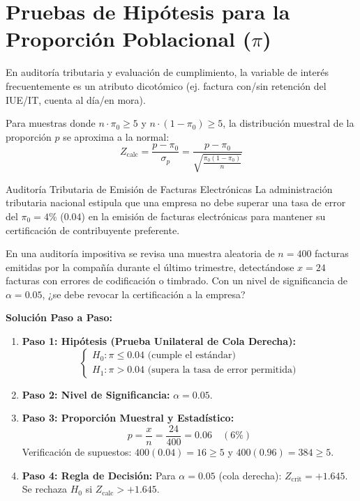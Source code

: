 \section{Pruebas de Hipótesis para la Proporción Poblacional ($\pi$)}
En auditoría tributaria y evaluación de cumplimiento, la variable de interés frecuentemente es un atributo dicotómico (ej. factura con/sin retención del IUE/IT, cuenta al día/en mora). 

Para muestras donde $n \cdot \pi_0 \ge 5$ y $n \cdot (1 - \pi_0) \ge 5$, la distribución muestral de la proporción $p$ se aproxima a la normal:
\begin{equation}
    Z_{\text{calc}} = \frac{p - \pi_0}{\sigma_p} = \frac{p - \pi_0}{\sqrt{\frac{\pi_0 (1 - \pi_0)}{n}}}
\end{equation}

\begin{ejemplo}{Auditoría Tributaria de Emisión de Facturas Electrónicas}
La administración tributaria nacional estipula que una empresa no debe superar una tasa de error del $\pi_0 = 4\%$ ($0.04$) en la emisión de facturas electrónicas para mantener su certificación de contribuyente preferente.

En una auditoría impositiva se revisa una muestra aleatoria de $n = 400$ facturas emitidas por la compañía durante el último trimestre, detectándose $x = 24$ facturas con errores de codificación o timbrado. Con un nivel de significancia de $\alpha = 0.05$, ¿se debe revocar la certificación a la empresa?

\tcbline
\textbf{Solución Paso a Paso:}
\begin{enumerate}
    \item \textbf{Paso 1: Hipótesis (Prueba Unilateral de Cola Derecha):}
    \[
    \begin{cases} H_0: \pi \le 0.04 \text{ (cumple el estándar)} \\ H_1: \pi > 0.04 \text{ (supera la tasa de error permitida)} \end{cases}
    \]
    
    \item \textbf{Paso 2: Nivel de Significancia:} $\alpha = 0.05$.
    
    \item \textbf{Paso 3: Proporción Muestral y Estadístico:}
    \[
    p = \frac{x}{n} = \frac{24}{400} = 0.06 \quad (6\%)
    \]
    Verificación de supuestos: $400(0.04) = 16 \ge 5$ y $400(0.96) = 384 \ge 5$.
    
    \item \textbf{Paso 4: Regla de Decisión:}
    Para $\alpha = 0.05$ (cola derecha): $Z_{\text{crit}} = +1.645$.
    Se rechaza $H_0$ si $Z_{\text{calc}} > +1.645$.
    

\end{enumerate}
\end{ejemplo}
